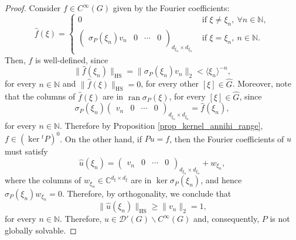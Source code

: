 \documentclass[11pt]{amsart}
\numberwithin{theorem}{section}
\numberwithin{equation}{section}
\theoremstyle{definition}
\numberwithin{example}{section}
\theoremstyle{definition}
\theoremstyle{definition}
\newcommand{\N}{\mathbb{N}}
\newcommand{\C}{\mathbb{C}}
\newcommand{\HS}{\operatorname{HS}}
\begin{document}
\begin{proof}
Consider $f\in C^\infty(G)$ given by the Fourier coefficients:
\begin{equation*}
    \widehat{f}(\xi)=\begin{cases}
        0&\text{ if }\xi\neq \xi_n,\ \forall n\in\N,\\
        \begin{pmatrix}
            \sigma_P(\xi_n)v_n&0&\cdots&0 
        \end{pmatrix}_{d_{\xi_n}\times d_{\xi_n}}&\text{ if }\xi= \xi_n,\ n\in\N.
    \end{cases}
\end{equation*}
Then, $f$ is well-defined, since 
\begin{equation*}
    \|\widehat{f}(\xi_n)\|_{\HS}=\|\sigma_P(\xi_n)v_n\|_2<\langle \xi_n \rangle ^{-n},
\end{equation*}
for every $n\in\N$ and $ \|\widehat{f}(\xi)\|_{\HS}=0$, for every other $[\xi]\in\widehat{G}$. Moreover, note that the columns of $\widehat{f}(\xi)$ are in $ \operatorname{ran}\sigma_P(\xi)$, for every $[\xi]\in\widehat{G}$, since 
\begin{equation*}
    \sigma_P(\xi_n)\begin{pmatrix}
            v_n&0&\cdots&0 
        \end{pmatrix}_{d_{\xi_n}\times d_{\xi_n}}=\widehat{f}(\xi_n),
\end{equation*}
for every $n\in\N$. Therefore by Proposition \ref{prop_kernel_annihi_range}, $f\in (\ker {}^tP)^0$. On the other hand, if $Pu=f$, then  the Fourier coefficients of $u$ must satisfy
\begin{equation*}
    \widehat{u}(\xi_n)=
        \begin{pmatrix}
            v_n&0&\cdots&0 
        \end{pmatrix}_{d_{\xi_n}\times d_{\xi_n}}+w_{\xi_n},
\end{equation*}
where the columns of $w_{\xi_n}\in \C^{d_\xi\times d_\xi}$ are in $\ker \sigma_P(\xi_n)$, and hence $\sigma_P(\xi_n)w_{\xi_n}=0$. Therefore, by orthogonality, we conclude that 
\begin{equation*}
    \|\widehat{u}(\xi_n)\|_{\HS}\geq \|v_n\|_2=1,
\end{equation*}
for every $n\in\N$. Therefore,  $u\in\mathcal{D}'(G)\backslash C^\infty(G)$ and, consequently, $P$ is not globally solvable.
\end{proof}
\end{document}
